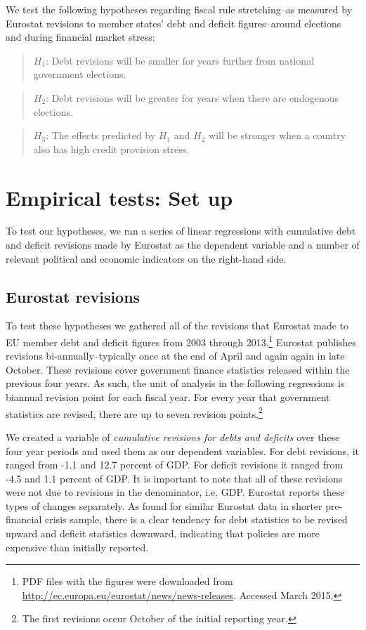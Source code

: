 \documentclass[]{article}
\begin{document}
We test the following hypotheses regarding fiscal rule stretching--as measured by Eurostat revisions to member states' debt and deficit figures--around elections and during financial market stress:

\begin{quote}
    $H_{1}$: Debt revisions will be smaller for years further from national government elections.
\end{quote}

\begin{quote}
    $H_{2}$: Debt revisions will be greater for years when there are endogenous elections.
\end{quote}

\begin{quote}
    $H_{3}$: The effects predicted by $H_{1}$ and $H_{2}$ will be stronger when a country also has high credit provision stress.
\end{quote}

\section{Empirical tests: Set up}

To test our hypotheses, we ran a series of linear regressions with cumulative debt and deficit revisions made by Eurostat as the dependent variable and a number of relevant political and economic indicators on the right-hand side.

\subsection{Eurostat revisions}

To test these hypotheses we gathered all of the revisions that Eurostat made to EU member debt and deficit figures from 2003 through 2013.\footnote{PDF files with the figures were downloaded from \url{http://ec.europa.eu/eurostat/news/news-releases}. Accessed March 2015.} Eurostat publishes revisions bi-annually--typically once at the end of April and again again in late October. These revisions cover government finance statistics released within the previous four years. As such, the unit of analysis in the following regressions is biannual revision point for each fiscal year. For every year that government statistics are revised, there are up to seven revision points.\footnote{The first revisions occur October of the initial reporting year.}

We created a variable of \emph{cumulative revisions for debts and deficits} over these four year periods and used them as our dependent variables. For debt revisions, it ranged from -1.1 and 12.7 percent of GDP. For deficit revisions it ranged from -4.5 and 1.1 percent of GDP. It is important to note that all of these revisions were not due to revisions in the denominator, i.e. GDP. Eurostat reports these types of changes separately. As \cite{DeCastro2013} found for similar Eurostat data in shorter pre-financial crisis sample, there is a clear tendency for debt statistics to be revised upward and deficit statistics downward, indicating that policies are more expensive than initially reported.
\end{document}
